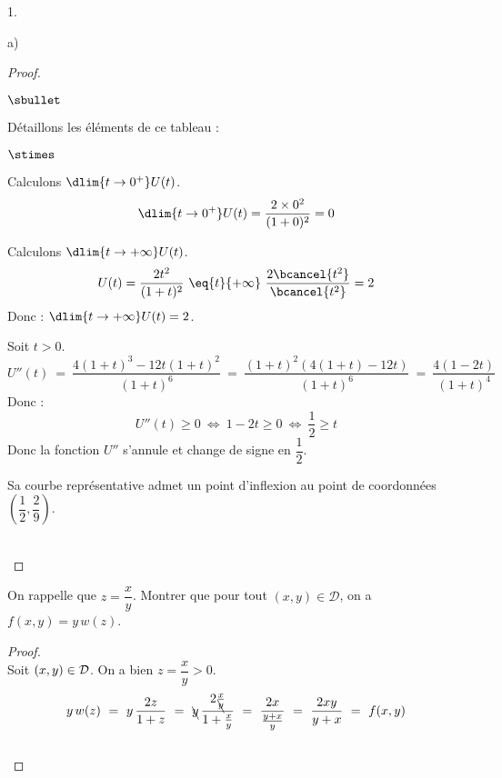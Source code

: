 \begin{noliste}{1.}
\begin{noliste}{a)}
\begin{proof}
\begin{noliste}{$\sbullet$}
    \begin{center}
     \end{center}
     
     Détaillons les éléments de ce tableau :
     \begin{noliste}{$\stimes$}
      \item Calculons $\dlim{t\to 0^+} U(t)$.
      \[
       \dlim{t\to 0^+} U(t) = \dfrac{2 \times 0^2}{(1+0)^2} = 0
      \]
      \item Calculons $\dlim{t\to +\infty} U(t)$.
      \[
       U(t) = \dfrac{2t^2}{(1+t)^2} \ \eq{t}{+\infty} \ 
       \dfrac{2 \bcancel{t^2}}{\bcancel{t^2}} = 2
      \]
      Donc : $\dlim{t\to +\infty} U(t)=2$.
     \end{noliste}
     
     
     \newpage
     

     \item Soit $t>0$.
     \[
      U''(t) \ = \ \dfrac{4(1+t)^3 - 12t(1+t)^2}{(1+t)^6}
      \ = \ \dfrac{(1+t)^2\left( 4(1+t) -12t\right)}{(1+t)^6}
      \ = \ \dfrac{4(1-2t)}{(1+t)^4}
     \]
     Donc :
     \[
      U''(t) \geq 0 \ \Leftrightarrow \ 1-2t \geq 0 
      \ \Leftrightarrow \ \dfrac{1}{2} \geq t
     \]
     Donc la fonction $U''$ s'annule et change de signe en 
     $\dfrac{1}{2}$.
   \end{noliste}
   \begin{remark}
     Sa courbe représentative admet un point d'inflexion au point
     de coordonnées $\left(\dfrac{1}{2},\dfrac{2}{9}\right)$.
   \end{remark}~\\[-1.4cm]
 \end{proof}
  
  \item On rappelle que $z=\dfrac{x}{y}$. Montrer que pour tout $(x,y) 
  \in \mathcal{D}$, on a $f(x,y)=y \, w(z)$.
  
  \begin{proof}~\\
   Soit $(x,y) \in {\cal D}$. On a bien $z=\dfrac{x}{y} >0$.
   \[
    y \, w(z) \ = \ y \, \dfrac{2z}{1+z} \ = \ \bcancel{y} \, 
    \dfrac{2 \frac{x}{\bcancel{y}}}{1+\frac{x}{y}}
    \ = \ \dfrac{2x}{\frac{y+x}{y}} \ = \ \dfrac{2xy}{y+x} \ = \ f(x,y)
   \]
   ~\\[-1cm]
  \end{proof}


\end{noliste}
\end{noliste}
